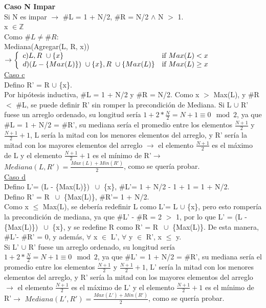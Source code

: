 \documentclass{article}
\theoremstyle{definition}
\theoremstyle{remark}
\begin{document}
\textbf{Caso N Impar} \\ 

Si N es impar $\rightarrow$ \#L = 1 + N/2, \#R = N/2 $\wedge$ N $>$ 1.\\ 

x $\in \mathds{Z}$ \\

Como $\#L \neq \#R$: \\

Mediana(Agregar(L, R, x)) $\rightarrow \left\{ \begin{array}{ll} c) L, R \ \cup \{x\} & \mbox{if } Max(L) < x \\ d) (L - \{Max(L)\}) \ \cup \{x\}, R \ \cup \{Max(L)\}  & \mbox{if } Max(L) \geq x \\ \end{array} \right.$\\
                                    
\underline{Caso c} \\

Defino R' = R $\cup$ \{x\}. \\

Por hipótesis inductiva, \#L = 1 + N/2 y \#R = N/2. Como x $>$ Max(L), y \#R $<$ \#L, se puede definir R' sin romper la precondición de Mediana.
Si L $\cup$ R' fuese un arreglo ordenado, su longitud sería $1 + 2 * \frac{N}{2} = N + 1 \equiv 0 \mod 2$, ya que \#L = 1 + N/2 = \#R', su mediana sería el promedio entre los elementos $\frac{N+1}{2}$ y $\frac{N+1}{2} + 1$, L sería la mitad con los menores elementos del arreglo, y R' sería la mitad con los mayores elementos del arreglo $\rightarrow$ el elemento $\frac{N+1}{2}$ es el máximo de L y el elemento $\frac{N+1}{2} + 1$ es el mínimo de R'$\rightarrow$ $Mediana(L, R') = \frac{Max(L) + Min(R')}{2}$, como se quería probar. \\

\underline{Caso d} \\

Defino L'= (L - \{Max(L)\}) $\ \cup$ \{x\}, \#L'= 1 + N/2 - 1 + 1 = 1 + N/2. \\

Defino R' = R $\ \cup$ \{Max(L)\}, \#R'= 1 + N/2. \\

Como x $\leq$ Max(L), se debería redefinir L como L'= L $\cup$ \{x\}, pero esto rompería la precondición de mediana, ya que \#L' - \#R = 2 $>$ 1, por lo que L' = (L - \{Max(L)\}) $\ \cup$ \{x\}, y se redefine R como R' = R $\ \cup$ \{Max(L)\}. De esta manera, \#L'- \#R' = 0, y además, $\forall$ x $\in$ L', $\forall$ y $\in$ R', x $\leq$ y. \\
Si L' $\cup$ R' fuese un arreglo ordenado, su longitud sería $1 + 2 * \frac{N}{2} = N + 1 \equiv 0 \mod 2$, ya que \#L' = 1 + N/2 = \#R', su mediana sería el promedio entre los elementos $\frac{N+1}{2}$ y $\frac{N+1}{2} + 1$, L' sería la mitad con los menores elementos del arreglo, y R' sería la mitad con los mayores elementos del arreglo $\rightarrow$ el elemento $\frac{N+1}{2}$ es el máximo de L' y el elemento $\frac{N+1}{2} + 1$ es el mínimo de R'$\rightarrow$ $Mediana(L', R') = \frac{Max(L') + Min(R')}{2}$, como se quería probar. \\
\end{document}
